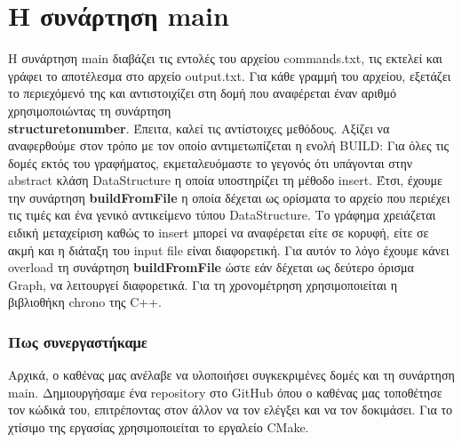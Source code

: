 \documentclass[12pt,a4paper]{article}
\begin{document}
    \part*{Η συνάρτηση main}
    Η συνάρτηση main διαβάζει τις εντολές του αρχείου commands.txt, τις εκτελεί και γράφει το αποτέλεσμα στο αρχείο output.txt. Για κάθε γραμμή του αρχείου, 
    εξετάζει το περιεχόμενό της και αντιστοιχίζει στη δομή που αναφέρεται έναν αριθμό χρησιμοποιώντας τη συνάρτηση\\ \textbf{structuretonumber}. Έπειτα, καλεί τις 
    αντίστοιχες μεθόδους. Αξίζει να αναφερθούμε στον τρόπο με τον οποίο αντιμετωπίζεται η ενολή BUILD: Για όλες τις δομές εκτός του γραφήματος, εκμεταλευόμαστε 
    το γεγονός ότι υπάγονται στην abstract κλάση DataStructure η οποία υποστηρίζει τη μέθοδο insert. Έτσι, έχουμε την συνάρτηση \textbf{buildFromFile} η οποία 
    δέχεται ως ορίσματα το αρχείο που περιέχει τις τιμές και ένα γενικό αντικείμενο τύπου DataStructure. Το γράφημα χρειάζεται ειδική μεταχείριση καθώς το insert 
    μπορεί να αναφέρεται είτε σε κορυφή, είτε σε ακμή και η διάταξη του input file είναι διαφορετική. Για αυτόν το λόγο έχουμε κάνει overload τη συνάρτηση 
    \textbf{buildFromFile} ώστε εάν δέχεται ως δεύτερο όρισμα Graph, να λειτουργεί διαφορετικά. Για τη χρονομέτρηση χρησιμοποιείται η βιβλιοθήκη chrono της 
    C++.
    \section*{Πως συνεργαστήκαμε}
    Αρχικά, ο καθένας μας ανέλαβε να υλοποιήσει συγκεκριμένες δομές και τη συνάρτηση main. Δημιουργήσαμε ένα repository στο GitHub όπου ο καθένας μας τοποθέτησε 
    τον κώδικά του, επιτρέποντας στον άλλον να τον ελέγξει και να τον δοκιμάσει. Για το χτίσιμο της εργασίας χρησιμοποιείται το εργαλείο CMake.
\end{document}

